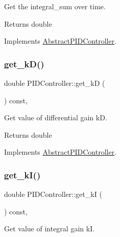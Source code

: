 Get the integral\+\_\+sum over time. 

\begin{DoxyReturn}{Returns}
double 
\end{DoxyReturn}


Implements \hyperlink{classAbstractPIDController}{Abstract\+P\+I\+D\+Controller}.

\mbox{\label{classPIDController_a0f366ed8608947fa17454682773a48ee}} 
\subsubsection{\texorpdfstring{get\+\_\+k\+D()}{get\_kD()}}
{\footnotesize\ttfamily double P\+I\+D\+Controller\+::get\+\_\+kD (\begin{DoxyParamCaption}{ }\end{DoxyParamCaption}) const\hspace{0.3cm}{\ttfamily [override]}, {\ttfamily [virtual]}}



Get value of differential gain kD. 

\begin{DoxyReturn}{Returns}
double 
\end{DoxyReturn}


Implements \hyperlink{classAbstractPIDController}{Abstract\+P\+I\+D\+Controller}.

\mbox{\label{classPIDController_af79b88e9f6c99667fb1474219f00f6f3}} 
\subsubsection{\texorpdfstring{get\+\_\+k\+I()}{get\_kI()}}
{\footnotesize\ttfamily double P\+I\+D\+Controller\+::get\+\_\+kI (\begin{DoxyParamCaption}{ }\end{DoxyParamCaption}) const\hspace{0.3cm}{\ttfamily [override]}, {\ttfamily [virtual]}}



Get value of integral gain kI. 

